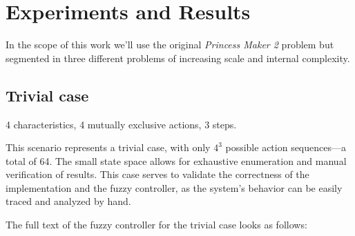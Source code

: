 \documentclass[11pt, a4paper]{article}
\begin{document}
	\section{Experiments and Results}

	In the scope of this work we'll use the original \textit{Princess Maker 2} problem but segmented in three different problems of increasing scale and internal complexity.
	
	\subsection{Trivial case}\label{trivial-case}

	4 characteristics, 4 mutually exclusive actions, 3 steps.

	This scenario represents a trivial case, with only $4^{3}$ possible action sequences—a total of 64.
	The small state space allows for exhaustive enumeration and manual verification of results.
	This case serves to validate the correctness of the implementation and the fuzzy controller, as the system's behavior can be easily traced and analyzed by hand.

	The full text of the fuzzy controller for the trivial case looks as follows:
	
\end{document}
